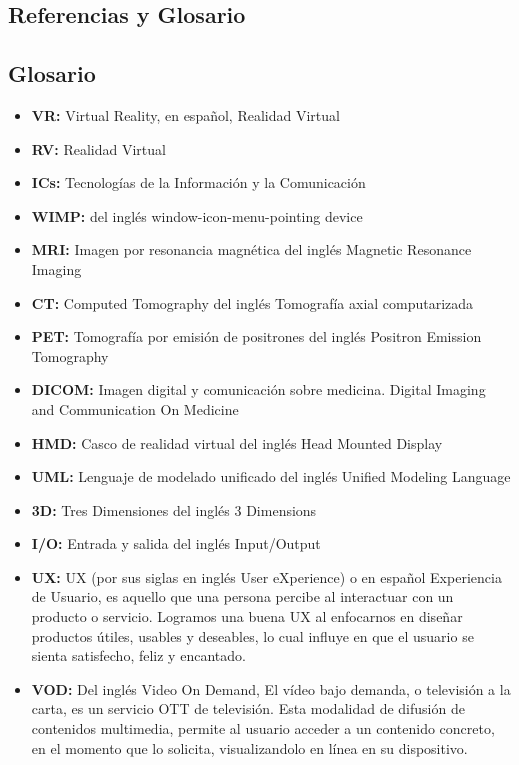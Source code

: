 \begin{center}
\chapter{Referencias y Glosario}
\end{center}
\newpage

\section{Glosario}
\begin{itemize}
 \item \textbf{VR:} Virtual Reality, en español, Realidad Virtual
 \item \textbf{RV:} Realidad Virtual
 \item \textbf{ICs:} Tecnologías de la Información y la Comunicación
 \item \textbf{WIMP:} del inglés window-icon-menu-pointing device
 \item \textbf{MRI:} Imagen por resonancia magnética del inglés Magnetic Resonance Imaging
 \item \textbf{CT:} Computed Tomography del inglés Tomografía axial computarizada
 \item \textbf{PET:} Tomografía por emisión de positrones del inglés Positron Emission Tomography
 \item \textbf{DICOM:} Imagen digital y comunicación sobre medicina. Digital Imaging and Communication On Medicine
 \item \textbf{HMD:} Casco de realidad virtual del inglés Head Mounted Display
 \item \textbf{UML:} Lenguaje de modelado unificado del inglés Unified Modeling Language
 \item \textbf{3D:} Tres Dimensiones del inglés 3 Dimensions
 \item \textbf{I/O:} Entrada y salida del inglés Input/Output
 \item \textbf{UX:} UX (por sus siglas en inglés User eXperience) o en español Experiencia de Usuario, es aquello que una persona percibe al interactuar con un producto o servicio. Logramos una buena UX al enfocarnos en diseñar productos útiles, usables y deseables, lo cual influye en que el usuario se sienta satisfecho, feliz y encantado.
 \item \textbf{VOD:} Del inglés  Video On Demand, El vídeo bajo demanda, o televisión a la carta, es un servicio OTT de televisión. Esta modalidad de difusión de contenidos multimedia, permite al usuario acceder a un contenido concreto, en el momento que lo solicita, visualizandolo en línea en su dispositivo.

\end{itemize}

